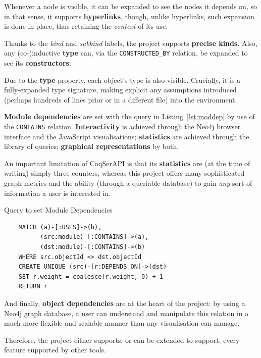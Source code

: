 Whenever a node is visible, it can be expanded to see the nodes it depends on,
so in that sense, it supports \textbf{hyperlinks}, though, unlike hyperlinks,
such expansion is done in place, thus retaining the \emph{context} of its use.

Thanks to the \emph{kind} and \emph{subkind} labels, the project supports
\textbf{precise kinds}.  Also, any (co-)inductive \textbf{type} can, via the
\texttt{CONSTRUCTED\_BY} relation, be expanded to see its
\textbf{constructors}.

Due to the \textbf{type} property, each object's type is also visible.
Crucially, it is a fully-expanded type signature, making explicit any
assumptions introduced (perhaps hundreds of lines prior or in a different file)
into the environment.

\textbf{Module dependencies} are set with the query in Listing~\ref{lst:moddep}
by use of the \texttt{CONTAINS} relation. \textbf{Interactivity} is achieved
through the Neo4j browser interface and the JavaScript visualisations;
\textbf{statistics} are achieved through the library of queries;
\textbf{graphical representations} by both.

An important limitation of CoqSerAPI is that its \textbf{statistics} are (at
the time of writing) simply three counters, whereas this project offers many
sophisticated graph metrics and the ability (through a queriable database) to
gain \emph{any} sort of information a user is interested in.

\begin{listing}[tp]%

\caption{Query to set Module Dependencies}\label{lst:moddep}

  \begin{verbatim}
    MATCH (a)-[:USES]->(b),
          (src:module)-[:CONTAINS]->(a),
          (dst:module)-[:CONTAINS]->(b)
    WHERE src.objectId <> dst.objectId
    CREATE UNIQUE (src)-[r:DEPENDS_ON]->(dst)
    SET r.weight = coalesce(r.weight, 0) + 1
    RETURN r
  \end{verbatim}

\end{listing}

And finally, \textbf{object dependencies} are at the heart of the project: by
using a Neo4j graph database, a user can understand and manipulate this
relation in a much more flexible and scalable manner than any visualisation can
manage.

Therefore, the project either supports, or can be extended to support, every
feature supported by other tools. 

